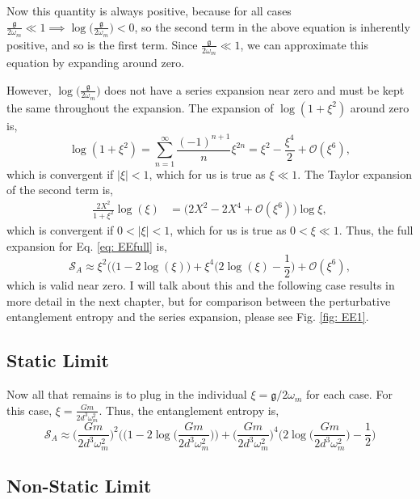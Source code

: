\documentclass[12pt,a4paper]{report}
\theoremstyle{plain}
\theoremstyle{definition}
\theoremstyle{remark}
\newcommand{\g}{\mathfrak{g}}
\begin{document}
Now this quantity is always positive, because for all cases $\frac{\mathfrak{g}}{2\omega_{m}} \ll 1 \implies \log\big(\frac{\mathfrak{g}}{2\omega_{m}}\big) < 0$, so the second term in the above equation is inherently positive, and so is the first term.
Since $\frac{\mathfrak{g}}{2\omega_{m}} \ll 1$, we can approximate this equation by expanding around zero. 

However, $\log\Big(\frac{\mathfrak{g}}{2\omega_{m}}\Big)$ does not have a series expansion near zero and must be kept the same throughout the expansion.
The expansion of $\log(1+\xi^2)$ around zero is,
\begin{equation}
    \log(1+\xi^2)=\sum_{n=1}^\infty\frac{(-1)^{n+1}}{n}\xi^{2n}=\xi^2-\frac{\xi^4}{2}+\mathcal{O}(\xi^6),
\end{equation}
which is convergent if $|\xi| < 1$, which for us is true as $\xi \ll 1$.
The Taylor expansion of the second term is,
\begin{equation}
    \begin{aligned}
        \frac{2X^2}{1+\xi^2}\log(\xi) &= \Big(2X^2 - 2X^4 + \mathcal{O}(\xi^6)\Big)\log{\xi},
    \end{aligned}
\end{equation}
which is convergent if $0< |\xi| < 1$, which for us is true as $0< \xi \ll 1$.
Thus, the full expansion for Eq. \ref{eq: EEfull} is,
\begin{equation}
    \mathcal{S}_A \approx {\xi}^2 \Big((1 - 2\log(\xi)\Big) + \xi^4 \Big(2\log(\xi) - \frac{1}{2}\Big) + \mathcal{O}(\xi^6),
\end{equation}
which is valid near zero. I will talk about this and the following case results in more detail in the next chapter, but for comparison between the perturbative entanglement entropy and the series expansion, please see Fig. \ref{fig: EE1}.
\subsection{Static Limit}
Now all that remains is to plug in the individual $\xi = \g/2\omega_m$ for each case. For this case, $\xi = \frac{Gm}{2d^3\omega_m^2}.$
Thus, the entanglement entropy is,
\begin{equation}
    \mathcal{S}_A \approx \Big({\frac{Gm}{2d^3\omega_m^2}}\Big)^2 \Big((1 - 2\log\Big({\frac{Gm}{2d^3\omega_m^2}}\Big)\Big) + \Big({\frac{Gm}{2d^3\omega_m^2}}\Big)^4 \Big(2\log\Big({\frac{Gm}{2d^3\omega_m^2}}\Big) - \frac{1}{2}\Big)
\end{equation}
\subsection{Non-Static Limit}
\end{document}
